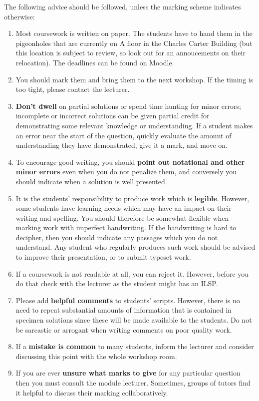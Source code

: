 \documentclass[11pt,a4paper]{amsart}
\begin{document}
The following advice should be followed, unless the marking scheme indicates otherwise:
\begin{enumerate}
\item Most coursework is written on paper. 
The students have to hand them in the pigeonholes that are currently on A floor in the Charles Carter Building (but this location is subject to review, so look out for an annoucements on their relocation).
The deadlines can be found on Moodle.
\item You should mark them and bring them to the next workshop. If the timing is too tight, please contact the lecturer. 	  
\item {\bf Don't dwell} on partial solutions or spend time hunting for minor errors; incomplete or incorrect solutions can be given partial credit for demonstrating some relevant knowledge or understanding. If a student makes an error near the start of the question, quickly evaluate the amount of understanding they have demonstrated, give it a mark, and move on.
\item To encourage good writing, you should {\bf point out notational and other minor errors} even when you do not penalize them, and conversely you should indicate when a solution is well presented.
\item  It is the students' responsibility to produce work which is {\bf legible}. However, some students have learning needs which may have an impact on their writing and spelling. You should therefore be somewhat flexible when marking work with imperfect handwriting. If the handwriting is hard to decipher, then you should indicate any passages which you do not understand. Any student who regularly produces such work should be advised to improve their presentation, or to submit typeset work.
\item If a coursework is not readable at all, you can reject it. 
      However, before you do that check with the lecturer as the student might has an ILSP.
\item Please add {\bf helpful comments} to students' scripts. However, there is no need to repeat substantial amounts of information that is contained in specimen solutions since these will be made available to the students. Do not be sarcastic or arrogant when writing comments on poor quality work.
\item  If a {\bf mistake is common} to many students, inform the lecturer and consider discussing this point with the whole workshop room.
 \item  If you are ever {\bf unsure what marks to give} for any particular question then you must consult the module lecturer. Sometimes, groups of tutors find it helpful to discuss their marking collaboratively.

\end{enumerate}
\end{document}
